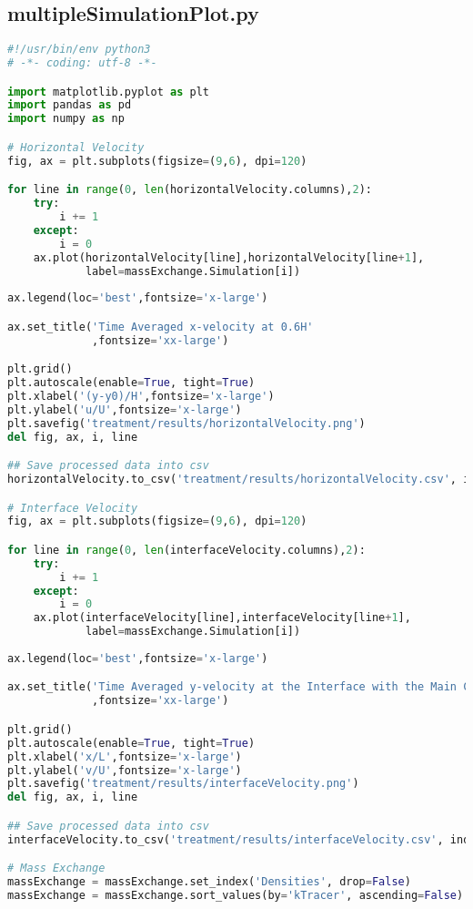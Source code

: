 \subsection{multipleSimulationPlot.py}
\begin{lstlisting}[language=python]
#!/usr/bin/env python3
# -*- coding: utf-8 -*-

import matplotlib.pyplot as plt
import pandas as pd
import numpy as np

# Horizontal Velocity
fig, ax = plt.subplots(figsize=(9,6), dpi=120)

for line in range(0, len(horizontalVelocity.columns),2):
    try:
        i += 1
    except:
        i = 0
    ax.plot(horizontalVelocity[line],horizontalVelocity[line+1],
            label=massExchange.Simulation[i])
    
ax.legend(loc='best',fontsize='x-large')

ax.set_title('Time Averaged x-velocity at 0.6H'
             ,fontsize='xx-large')

plt.grid()
plt.autoscale(enable=True, tight=True)
plt.xlabel('(y-y0)/H',fontsize='x-large')
plt.ylabel('u/U',fontsize='x-large')
plt.savefig('treatment/results/horizontalVelocity.png')
del fig, ax, i, line

## Save processed data into csv
horizontalVelocity.to_csv('treatment/results/horizontalVelocity.csv', index=False)

# Interface Velocity
fig, ax = plt.subplots(figsize=(9,6), dpi=120)

for line in range(0, len(interfaceVelocity.columns),2):
    try:
        i += 1
    except:
        i = 0
    ax.plot(interfaceVelocity[line],interfaceVelocity[line+1],
            label=massExchange.Simulation[i])
    
ax.legend(loc='best',fontsize='x-large')

ax.set_title('Time Averaged y-velocity at the Interface with the Main Channel'
             ,fontsize='xx-large')

plt.grid()
plt.autoscale(enable=True, tight=True)
plt.xlabel('x/L',fontsize='x-large')
plt.ylabel('v/U',fontsize='x-large')
plt.savefig('treatment/results/interfaceVelocity.png')
del fig, ax, i, line

## Save processed data into csv
interfaceVelocity.to_csv('treatment/results/interfaceVelocity.csv', index=False)

# Mass Exchange
massExchange = massExchange.set_index('Densities', drop=False)
massExchange = massExchange.sort_values(by='kTracer', ascending=False)


\end{lstlisting}
